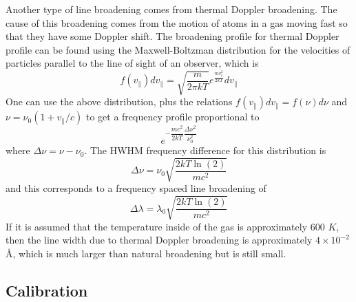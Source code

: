 \documentclass[11pt,letterpaper]{article}
\begin{document}
Another type of line broadening comes from thermal Doppler broadening. The cause
of this broadening comes from the motion of atoms in a gas moving fast so that
they have some Doppler shift. The broadening profile for thermal Doppler profile
can be found using the Maxwell-Boltzman distribution for the velocities of
particles parallel to the line of sight of an observer, which is
\cite{StellarAstro}
\begin{equation}
    f\left(v_{\parallel}\right) dv_{\parallel}= \sqrt{\frac{m}{2\pi k T}}
    e^\frac{mv^2_{\parallel}}{2kT} dv_{\parallel}
\end{equation}
One can use the above distribution, plus the relations
$f\left(v_{\parallel}\right) dv_{\parallel} = f\left(\nu\right) d\nu$ and 
$\nu = \nu_0 \left(1 + v_{\parallel} / c\right)$ to get a frequency profile
proportional to
\begin{equation}
    e^{-\dfrac{mc^2}{2kT}\dfrac{\Delta\nu^2}{\nu_0^2}}
\end{equation}
where $\Delta \nu = \nu - \nu_0$. The HWHM frequency difference for this
distribution is
\begin{equation}
    \Delta \nu = \nu_0 \sqrt{\frac{2kT\ln\left(2\right)}{mc^2}}
\end{equation}
and this corresponds to a frequency spaced line broadening of
\begin{equation}
    \Delta \lambda = \lambda_0 \sqrt{\frac{2kT\ln\left(2\right)}{mc^2}}
\end{equation}
If it is assumed that the temperature inside of the gas is approximately 600
$K$, then the line width due to thermal Doppler broadening is approximately
$4 \times 10^{-2}$ \AA, which is much larger than natural broadening but is
still small.

\subsection{Calibration}
\end{document}
